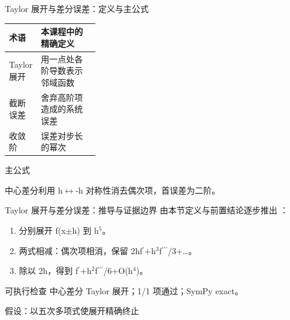 \begin{frame}[t]{Taylor 展开与差分误差：定义与主公式}
\footnotesize\begin{tabularx}{\linewidth}{p{0.30\linewidth}Y}
\toprule 术语 & 本课程中的精确定义\\\midrule
{} Taylor 展开 & 用一点处各阶导数表示邻域函数\\
 截断误差 & 舍弃高阶项造成的系统误差\\
 收敛阶 & 误差对步长的幂次\\
\bottomrule\end{tabularx}\vspace{0.15cm}
\begin{block}{ 主公式}\centering{}\end{block}
中心差分利用 h\ensuremath{\leftrightarrow}-h 对称性消去偶次项，首误差为二阶。
\end{frame}

\begin{frame}[t]{Taylor 展开与差分误差：推导与证据边界}
\footnotesize
{}\quad 由本节定义与前置结论逐步推出 ：
\begin{enumerate}
\item 分别展开 f(x\ensuremath{\pm}h) 到 h\ensuremath{^{5}}。
\item 两式相减：偶次项相消，保留 2hf\ensuremath{^{\prime}}+h\ensuremath{^{3}}f\ensuremath{^{\prime\prime\prime}}/\allowbreak{}3+…。
\item 除以 2h，得到 f\ensuremath{^{\prime}}+h\ensuremath{^{2}}f\ensuremath{^{\prime\prime\prime}}/\allowbreak{}6+O(h\ensuremath{^{4}})。
\end{enumerate}\begin{block}{可执行检查}
\quad 中心差分 Taylor 展开；1/1 项通过；SymPy exact。
\par\scriptsize 假设：以五次多项式使展开精确终止
\end{block}
\end{frame}

